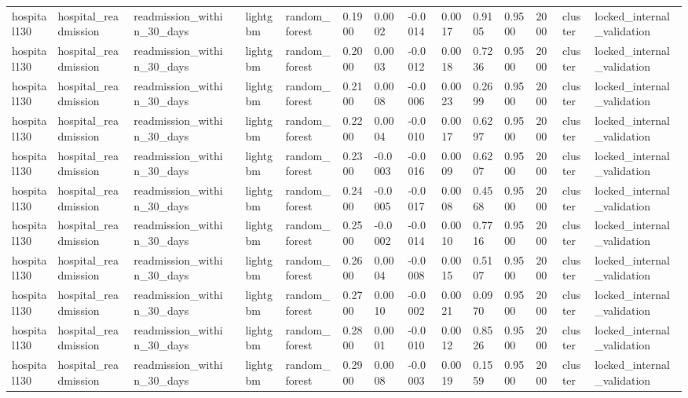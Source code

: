\begin{tabular}{lllllllllllllll}
hospital130 & hospital\_readmission & readmission\_within\_30\_days &  & lightgbm & random\_forest & 0.1900 & 0.0002 & -0.0014 & 0.0017 & 0.9105 & 0.9500 & 2000 & cluster & locked\_internal\_validation \\
hospital130 & hospital\_readmission & readmission\_within\_30\_days &  & lightgbm & random\_forest & 0.2000 & 0.0003 & -0.0012 & 0.0018 & 0.7236 & 0.9500 & 2000 & cluster & locked\_internal\_validation \\
hospital130 & hospital\_readmission & readmission\_within\_30\_days &  & lightgbm & random\_forest & 0.2100 & 0.0008 & -0.0006 & 0.0023 & 0.2699 & 0.9500 & 2000 & cluster & locked\_internal\_validation \\
hospital130 & hospital\_readmission & readmission\_within\_30\_days &  & lightgbm & random\_forest & 0.2200 & 0.0004 & -0.0010 & 0.0017 & 0.6297 & 0.9500 & 2000 & cluster & locked\_internal\_validation \\
hospital130 & hospital\_readmission & readmission\_within\_30\_days &  & lightgbm & random\_forest & 0.2300 & -0.0003 & -0.0016 & 0.0009 & 0.6207 & 0.9500 & 2000 & cluster & locked\_internal\_validation \\
hospital130 & hospital\_readmission & readmission\_within\_30\_days &  & lightgbm & random\_forest & 0.2400 & -0.0005 & -0.0017 & 0.0008 & 0.4568 & 0.9500 & 2000 & cluster & locked\_internal\_validation \\
hospital130 & hospital\_readmission & readmission\_within\_30\_days &  & lightgbm & random\_forest & 0.2500 & -0.0002 & -0.0014 & 0.0010 & 0.7716 & 0.9500 & 2000 & cluster & locked\_internal\_validation \\
hospital130 & hospital\_readmission & readmission\_within\_30\_days &  & lightgbm & random\_forest & 0.2600 & 0.0004 & -0.0008 & 0.0015 & 0.5107 & 0.9500 & 2000 & cluster & locked\_internal\_validation \\
hospital130 & hospital\_readmission & readmission\_within\_30\_days &  & lightgbm & random\_forest & 0.2700 & 0.0010 & -0.0002 & 0.0021 & 0.0970 & 0.9500 & 2000 & cluster & locked\_internal\_validation \\
hospital130 & hospital\_readmission & readmission\_within\_30\_days &  & lightgbm & random\_forest & 0.2800 & 0.0001 & -0.0010 & 0.0012 & 0.8526 & 0.9500 & 2000 & cluster & locked\_internal\_validation \\
hospital130 & hospital\_readmission & readmission\_within\_30\_days &  & lightgbm & random\_forest & 0.2900 & 0.0008 & -0.0003 & 0.0019 & 0.1559 & 0.9500 & 2000 & cluster & locked\_internal\_validation \\

\end{tabular}
